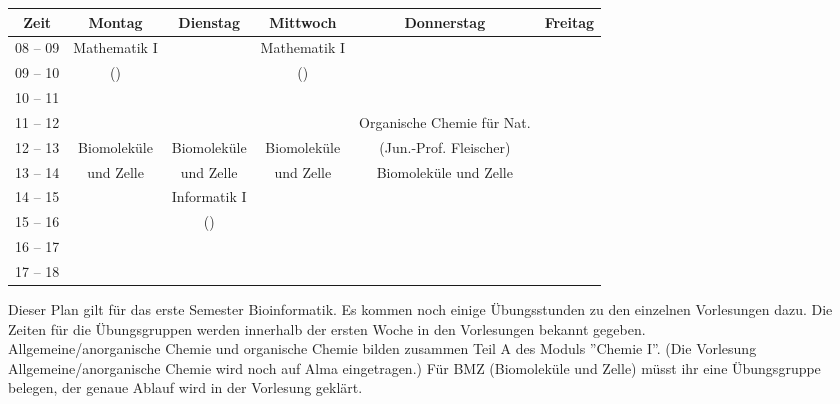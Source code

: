 \begin{minipage}{\textwidth}
    \footnotesize
\begin{tabular}{|c|c|c|c|c|c|} \hline
Zeit      & 		Montag 		& Dienstag			& Mittwoch 			& Donnerstag 			& Freitag\\\hline\hline
08 -- 09  & 		Mathematik I 	&  				& Mathematik I 		        &  				&\\\cline{1-1}\cline{3-3}\cline{5-6}
09 -- 10  & 		(\Matheprof)    &   				 & (\Matheprof)                 &  				&\\\hline
10 -- 11  &				&				&				&				&\\\hline
11 -- 12 & 				&  				&				& Organische Chemie für Nat.		&\\\cline{1-4} \cline{6-6}
12 -- 13 & 		Biomoleküle	&  Biomoleküle              & Biomoleküle    & 		(Jun.-Prof. Fleischer)	& \\\cline{1-1}\cline{3-3}\cline{5-6}
13 -- 14 & 		und Zelle       & und Zelle 	                & und Zelle           & 	Biomoleküle und Zelle				&  \\\hline
14 -- 15 & 				& Informatik I &                				&  				& \\\cline{1-2}\cline{4-6}
15 -- 16 &			                & (\Infoprof) 	    & 					& 				&\\\cline{1-3} \cline{5-6}
16 -- 17 & & & & &\\\hline
17 -- 18 & & & & & \\\hline
\end{tabular}
\end{minipage}
Dieser Plan gilt für das erste Semester Bioinformatik. Es kommen noch einige Übungsstunden
zu den einzelnen Vorlesungen dazu. Die Zeiten für die Übungsgruppen werden innerhalb der ersten Woche in den Vorlesungen bekannt gegeben.\\
Allgemeine/anorganische Chemie und organische Chemie bilden zusammen Teil A des Moduls ''Chemie I''. (Die Vorlesung Allgemeine/anorganische Chemie wird noch auf Alma eingetragen.)
Für BMZ (Biomoleküle und Zelle) müsst ihr eine Übungsgruppe belegen, der genaue Ablauf wird in der Vorlesung geklärt.


